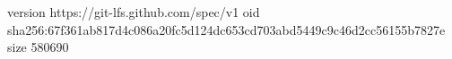version https://git-lfs.github.com/spec/v1
oid sha256:67f361ab817d4c086a20fc5d124dc653cd703abd5449c9c46d2cc56155b7827e
size 580690
